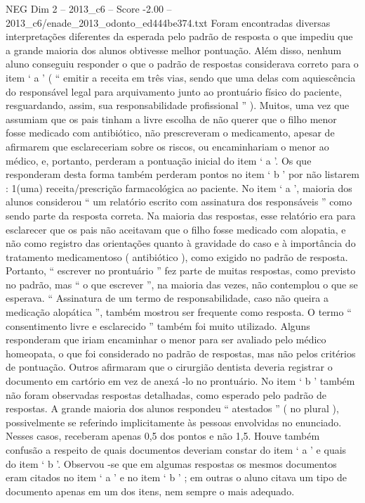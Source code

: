 \begin{textsample}{NEG Dim 2 – 2013\_c6 – Score -2.00 – 2013\_c6/enade\_2013\_odonto\_ed444be374.txt}
Foram encontradas diversas interpretações diferentes da esperada pelo padrão de resposta o que impediu que a grande maioria dos alunos obtivesse melhor pontuação.
Além disso, nenhum aluno conseguiu responder o que o padrão de respostas considerava correto para o item ‘ a ’ ( “ emitir a receita em três vias, sendo que uma delas com aquiescência do responsável legal para arquivamento junto ao prontuário físico do paciente, resguardando, assim, sua responsabilidade profissional ” ).
Muitos, uma vez que assumiam que os pais tinham a livre escolha de não querer que o filho menor fosse medicado com antibiótico, não prescreveram o medicamento, apesar de afirmarem que esclareceriam sobre os riscos, ou encaminhariam o menor ao médico, e, portanto, perderam a pontuação inicial do item ‘ a ’.
Os que responderam desta forma também perderam pontos no item ‘ b ’ por não listarem : 1(uma) receita/prescrição farmacológica ao paciente.
No item ‘ a ’, maioria dos alunos considerou “ um relatório escrito com assinatura dos responsáveis ” como sendo parte da resposta correta.
Na maioria das respostas, esse relatório era para esclarecer que os pais não aceitavam que o filho fosse medicado com alopatia, e não como registro das orientações quanto à gravidade do caso e à importância do tratamento medicamentoso ( antibiótico ), como exigido no padrão de resposta.
Portanto, “ escrever no prontuário ” fez parte de muitas respostas, como previsto no padrão, mas “ o que escrever ”, na maioria das vezes, não contemplou o que se esperava. “ Assinatura de um termo de responsabilidade, caso não queira a medicação alopática ”, também mostrou ser frequente como resposta.
O termo “ consentimento livre e esclarecido ” também foi muito utilizado.
Alguns responderam que iriam encaminhar o menor para ser avaliado pelo médico homeopata, o que foi considerado no padrão de respostas, mas não pelos critérios de pontuação.
Outros afirmaram que o cirurgião dentista deveria registrar o documento em cartório em vez de anexá -lo no prontuário.
No item ‘ b ’ também não foram observadas respostas detalhadas, como esperado pelo padrão de respostas.
A grande maioria dos alunos respondeu “ atestados ” ( no plural ), possivelmente se referindo implicitamente às pessoas envolvidas no enunciado.
Nesses casos, receberam apenas 0,5 dos pontos e não 1,5.
Houve também confusão a respeito de quais documentos deveriam constar do item ‘ a ’ e quais do item ‘ b ’.
Observou -se que em algumas respostas os mesmos documentos eram citados no item ‘ a ’ e no item ‘ b ’ ; em outras o aluno citava um tipo de documento apenas em um dos itens, nem sempre o mais adequado.

\end{textsample}
